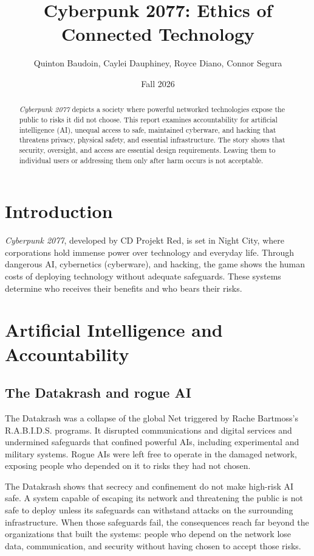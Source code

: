 \documentclass{article}%
\title{Cyberpunk 2077: Ethics of Connected Technology}
\author{Quinton Baudoin, Caylei Dauphiney, Royce Diano, Connor Segura}
\date{Fall 2026} %
\begin{document}
\maketitle
\nocite{Cyberpunk2077}

\begin{abstract}
\textit{Cyberpunk 2077} depicts a society where powerful networked technologies expose the public to risks it did not choose. This report examines accountability for artificial intelligence (AI), unequal access to safe, maintained cyberware, and hacking that threatens privacy, physical safety, and essential infrastructure. The story shows that security, oversight, and access are essential design requirements. Leaving them to individual users or addressing them only after harm occurs is not acceptable.
\end{abstract}

\section{Introduction}
\textit{Cyberpunk 2077}, developed by CD Projekt Red, is set in Night City, where corporations hold immense power over technology and everyday life. Through dangerous AI, cybernetics (cyberware), and hacking, the game shows the human costs of deploying technology without adequate safeguards. These systems determine who receives their benefits and who bears their risks.

\section{Artificial Intelligence and Accountability}
\subsection{The Datakrash and rogue AI}
The Datakrash was a collapse of the global Net triggered by Rache Bartmoss's R.A.B.I.D.S. programs. It disrupted communications and digital services and undermined safeguards that confined powerful AIs, including experimental and military systems. Rogue AIs were left free to operate in the damaged network, exposing people who depended on it to risks they had not chosen.

The Datakrash shows that secrecy and confinement do not make high-risk AI safe. A system capable of escaping its network and threatening the public is not safe to deploy unless its safeguards can withstand attacks on the surrounding infrastructure. When those safeguards fail, the consequences reach far beyond the organizations that built the systems: people who depend on the network lose data, communication, and security without having chosen to accept those risks.
\end{document}

